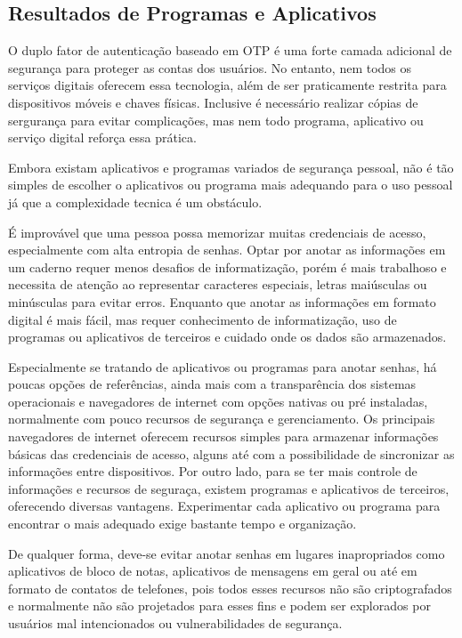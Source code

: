 \documentclass[12pt]{article}
\begin{document}
\subsection{Resultados de Programas e Aplicativos}

O duplo fator de autenticação baseado em OTP é uma forte camada adicional de segurança para
proteger as contas dos usuários.
No entanto, nem todos os serviços digitais oferecem essa tecnologia, além de ser praticamente
restrita para dispositivos móveis e chaves físicas.
Inclusive é necessário realizar cópias de sergurança para evitar complicações, mas nem todo
programa, aplicativo ou serviço digital reforça essa prática.

Embora existam aplicativos e programas variados de segurança pessoal, não é tão simples
de escolher o aplicativos ou programa mais adequando para o uso pessoal já que a
complexidade tecnica é um obstáculo.

É improvável que uma pessoa possa memorizar muitas credenciais de acesso, especialmente com
alta entropia de senhas.
Optar por anotar as informações em um caderno requer menos desafios de informatização, porém
é mais trabalhoso e necessita de atenção ao representar caracteres especiais, letras
maiúsculas ou minúsculas para evitar erros.
Enquanto que anotar as informações em formato digital é mais fácil, mas requer conhecimento
de informatização, uso de programas ou aplicativos de terceiros e cuidado onde os dados são
armazenados.

Especialmente se tratando de aplicativos ou programas para anotar senhas, há poucas
opções de referências, ainda mais com a transparência dos sistemas operacionais e
navegadores de internet com opções nativas ou pré instaladas, normalmente com pouco
recursos de segurança e gerenciamento.
Os principais navegadores de internet oferecem recursos simples para armazenar informações
básicas das credenciais de acesso, alguns até com a possibilidade de sincronizar as informações
entre dispositivos.
Por outro lado, para se ter mais controle de informações e recursos de seguraça, existem
programas e aplicativos de terceiros, oferecendo diversas vantagens.
Experimentar cada aplicativo ou programa para encontrar o mais adequado exige bastante tempo
e organização.

De qualquer forma, deve-se evitar anotar senhas em lugares inapropriados como aplicativos de
bloco de notas, aplicativos de mensagens em geral ou até em formato de contatos de telefones,
pois todos esses recursos não são criptografados e normalmente não são projetados para esses
fins e podem ser explorados por usuários mal intencionados ou vulnerabilidades de segurança.
\end{document}
